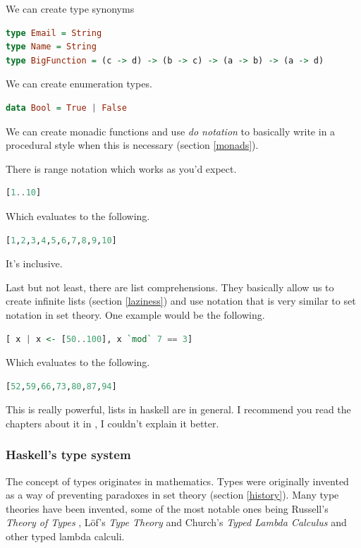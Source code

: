 \documentclass[11pt]{article}
\begin{document}
We can create type synonyms
\begin{lstlisting}[language=Haskell]
type Email = String
type Name = String
type BigFunction = (c -> d) -> (b -> c) -> (a -> b) -> (a -> d)
\end{lstlisting}

We can create enumeration types.
\begin{lstlisting}[language=Haskell]
data Bool = True | False
\end{lstlisting}

We can create monadic functions and use \emph{do notation} to basically write
in a procedural style when this is necessary (section \ref{monads}).

There is range notation which works as you'd expect.
\begin{lstlisting}[language=Haskell]
[1..10]
\end{lstlisting}
Which evaluates to the following.
\begin{lstlisting}[language=Haskell]
[1,2,3,4,5,6,7,8,9,10]
\end{lstlisting}
It's inclusive.

Last but not least, there are list comprehensions. They basically allow us to
create infinite lists (section \ref{laziness}) and use notation that is very
similar to set notation in set theory. One example would be the following.
\begin{lstlisting}[language=Haskell]
[ x | x <- [50..100], x `mod` 7 == 3]
\end{lstlisting}
Which evaluates to the following.
\begin{lstlisting}[language=Haskell]
[52,59,66,73,80,87,94]
\end{lstlisting}
This is really powerful, lists in haskell are in general. I recommend you read
the chapters about it in \parencite{miran2011}, I couldn't explain it better.

\subsubsection{Haskell's type system}\label{types}

The concept of types originates in mathematics. Types were originally invented
as a way of preventing paradoxes in set theory (section \ref{history}). Many
type theories have been invented, some of the most notable ones being Russell's
\emph{Theory of Types} \parencite{russell1903}, Löf's \emph{Type Theory}
\parencite{lof1984} and Church's \emph{Typed Lambda Calculus}
\parencite{church1940} and other typed lambda calculi.
\end{document}
